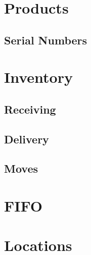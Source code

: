 %
%
%
%
%

\section{Products}
\subsection{Serial Numbers}

\section{Inventory}
\subsection{Receiving}
\subsection{Delivery}
\subsection{Moves}

\section{FIFO}

\section{Locations}

